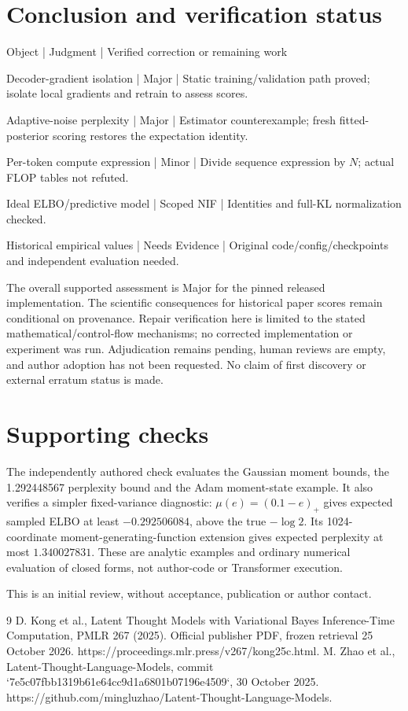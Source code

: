 \documentclass[10pt]{article}
\begin{document}
\section*{Conclusion and verification status}
Object | Judgment | Verified correction or remaining work\par
Decoder-gradient isolation | Major | Static training/validation path proved; isolate local gradients and retrain to assess scores.\par
Adaptive-noise perplexity | Major | Estimator counterexample; fresh fitted-posterior scoring restores the expectation identity.\par
Per-token compute expression | Minor | Divide sequence expression by \(N\); actual FLOP tables not refuted.\par
Ideal ELBO/predictive model | Scoped NIF | Identities and full-KL normalization checked.\par
Historical empirical values | Needs Evidence | Original code/config/checkpoints and independent evaluation needed.\par
The overall supported assessment is Major for the pinned released implementation. The scientific consequences for historical paper scores remain conditional on provenance. Repair verification here is limited to the stated mathematical/control-flow mechanisms; no corrected implementation or experiment was run. Adjudication remains pending, human reviews are empty, and author adoption has not been requested. No claim of first discovery or external erratum status is made.\par
\section*{Supporting checks}
The independently authored check evaluates the Gaussian moment bounds, the 1.292448567 perplexity bound and the Adam moment-state example. It also verifies a simpler fixed-variance diagnostic: \(\mu(e)=(0.1-e)_+\) gives expected sampled ELBO at least \(-0.292506084\), above the true \(-\log2\). Its 1024-coordinate moment-generating-function extension gives expected perplexity at most \(1.340027831\). These are analytic examples and ordinary numerical evaluation of closed forms, not author-code or Transformer execution.\par
This is an initial review, without acceptance, publication or author contact.\par
9 D. Kong et al., Latent Thought Models with Variational Bayes Inference-Time Computation, PMLR 267 (2025). Official publisher PDF, frozen retrieval 25 October 2026. https://proceedings.mlr.press/v267/kong25c.html. M. Zhao et al., Latent-Thought-Language-Models, commit `7e5c07fbb1319b61e64cc9d1a6801b07196e4509`, 30 October 2025. https://github.com/mingluzhao/Latent-Thought-Language-Models.\par
\end{document}
